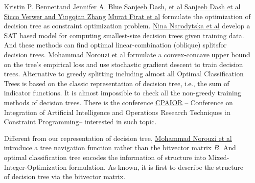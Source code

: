 \documentclass[UTF8]{article}
\begin{document}
\href{https://www.researchgate.net/publication/2796065_Optimal_Decision_Trees}{Kristin P. Bennettand Jennifer A. Blue}
\href{http://krvarshney.github.io/pubs/DashMV_icassp2015.pdf}{Sanjeeb Dash, et al}
\href{http://papers.nips.cc/paper/7716-boolean-decision-rules-via-column-generation.pdf}{Sanjeeb Dash et al}
\href{https://yingqianzhang.net/wp-content/uploads/2018/12/VerwerZhangAAAI-final.pdf}{Sicco Verwer and Yingqian Zhang}
\href{https://arxiv.org/pdf/1810.06684.pdf}{Murat Firat et al}
formulate the optimization of decision tree as constraint optimization problem.
\href{https://www.ijcai.org/proceedings/2018/0189.pdf}{Nina Narodytska et al}
develop a SAT based model for computing smallest-size decision trees given training data.
And these methods can find optimal linear-combination (oblique) splits\footnotemark  for decision trees.
\href{https://arxiv.org/abs/1511.04056}{Mohammad Norouzi et al}\cite{norouzi2015efficient} formulate a convex-concave upper bound
on the tree’s empirical loss and use stochastic gradient descent to train decision trees.
Alternative to greedy splitting including almost all Optimal Classification Trees
is based on the classic representation of decision tree, i.e.,
the sum of indicator functions.
It is almost impossible to check
all the non-greedy training methods of decision trees.
There is the conference \href{https://cpaior2017.dei.unipd.it/}{CPAIOR} --
Conference on Integration of Artificial Intelligence
and Operations Research Techniques in Constraint Programming--
interested in such topic.

Different from our representation of decision tree,
\href{https://arxiv.org/abs/1511.04056}{Mohammad Norouzi et al}
introduce a tree navigation function
rather than the bitvector matrix $B$.
And optimal classification tree encodes the information of structure
into Mixed-Integer-Optimization formulation.
As known, it is first to describe the structure of decision tree
via the bitvector matrix.
\end{document}
